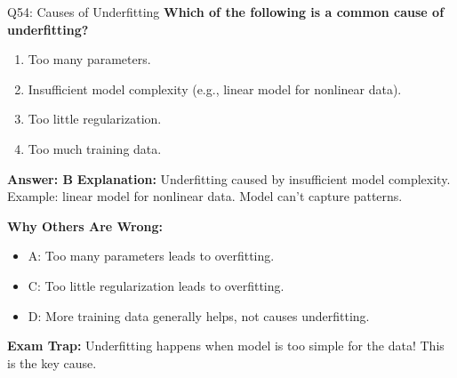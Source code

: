 \documentclass[8pt]{beamer}
\begin{document}
	\begin{frame}{Q54: Causes of Underfitting}
		\fontsize{6.5}{7.5}\selectfont
		\textbf{Which of the following is a common cause of underfitting?}
		
		\begin{enumerate}
			\item Too many parameters.
			\item Insufficient model complexity (e.g., linear model for nonlinear data).
			\item Too little regularization.
			\item Too much training data.
		\end{enumerate}
		
		\vspace{0.05cm}
		\textcolor{myblue}{\textbf{Answer: B}}
		\vspace{0.05cm}
		\textcolor{myblue}{\textbf{Explanation:}} Underfitting caused by insufficient model complexity. Example: linear model for nonlinear data. Model can't capture patterns.
		
		\vspace{0.05cm}
		\textcolor{myred}{\textbf{Why Others Are Wrong:}}
		\begin{itemize}
			\item \textcolor{myred}{A:} Too many parameters leads to overfitting.
			\item \textcolor{myred}{C:} Too little regularization leads to overfitting.
			\item \textcolor{myred}{D:} More training data generally helps, not causes underfitting.
		\end{itemize}
		
		\textcolor{myred}{\textbf{Exam Trap:}} Underfitting happens when \textcolor{myblue}{model is too simple} for the data! This is the key cause.
	\end{frame}
	
\end{document}
